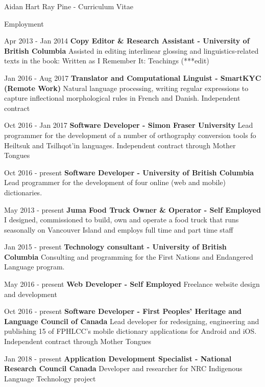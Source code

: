 \documentclass[12pt]{letter}
\begin{document}
\begin{cv}{ Aidan Hart Ray Pine  \space - \space   Curriculum Vitae}
         \begin{cvlist}{Employment}
                            \item[Apr 2013 - Jan 2014] \textbf{Copy Editor \& Research Assistant - University of British Columbia}
                \newline Assisted in editing interlinear glossing and linguistics-related texts in the book: Written as I Remember It: Teachings (***edit)
                            \item[Jan 2016 - Aug 2017] \textbf{Translator and Computational Linguist - SmartKYC (Remote Work)}
                \newline Natural language processing, writing regular expressions to capture inflectional morphological rules in French and Danish. Independent contract
                            \item[Oct 2016 - Jan 2017] \textbf{Software Developer - Simon Fraser University}
                \newline Lead programmer for the development of a number of orthography conversion tools fo Heiltsuk and Tsilhqot'in languages. Independent contract through Mother Tongues
                            \item[Oct 2016 - present] \textbf{Software Developer - University of British Columbia}
                \newline Lead programmer for the development of four online (web and mobile) dictionaries.
                            \item[May 2013 - present] \textbf{Juma Food Truck Owner \& Operator - Self Employed}
                \newline I designed, commissioned to build, own and operate a food truck that runs seasonally on Vancouver Island and employs full time and part time staff
                            \item[Jan 2015 - present] \textbf{Technology consultant - University of British Columbia}
                \newline Consulting and programming for the First Nations and Endangered Language program.
                            \item[May 2016 - present] \textbf{Web Developer - Self Employed}
                \newline Freelance website design and development
                            \item[Oct 2016 - present] \textbf{Software Developer - First Peoples' Heritage and Language Council of Canada}
                \newline Lead developer for redesigning, engineering and publishing 15 of FPHLCC's mobile dictionary applications for Android and iOS. Independent contract through Mother Tongues
                            \item[Jan 2018 - present] \textbf{Application Development Specialist - National Research Council Canada}
                \newline Developer and researcher for NRC Indigenous Language Technology project
                    \end{cvlist}
        

\end{cv}
\end{document}
